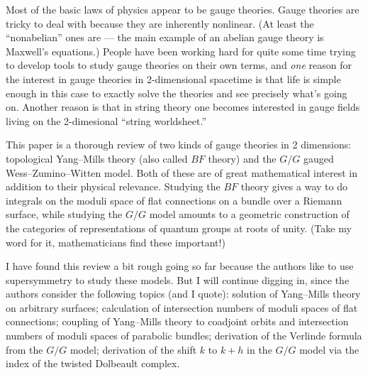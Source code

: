 \documentclass{article}
\def\tightlist{}
\renewcommand{\texttt}[1]{%
  \begingroup
  \ttfamily
  \begingroup\lccode`~=`/\lowercase{\endgroup\def~}{/\discretionary{}{}{}}%
  \begingroup\lccode`~=`[\lowercase{\endgroup\def~}{[\discretionary{}{}{}}%
  \begingroup\lccode`~=`.\lowercase{\endgroup\def~}{.\discretionary{}{}{}}%
  \catcode`/=\active\catcode`[=\active\catcode`.=\active
  \scantokens{#1\noexpand}%
  \endgroup
}
\begin{document}

Most of the basic laws of physics appear to be gauge theories. Gauge
theories are tricky to deal with because they are inherently nonlinear.
(At least the ``nonabelian'' ones are --- the main example of an abelian
gauge theory is Maxwell's equations.) People have been working hard for
quite some time trying to develop tools to study gauge theories on their
own terms, and \emph{one} reason for the interest in gauge theories in
2-dimensional spacetime is that life is simple enough in this case to
exactly solve the theories and see precisely what's going on. Another
reason is that in string theory one becomes interested in gauge fields
living on the 2-dimesional ``string worldsheet.''

This paper is a thorough review of two kinds of gauge theories in 2
dimensions: topological Yang--Mills theory (also called \(BF\) theory)
and the \(G/G\) gauged Wess--Zumino--Witten model. Both of these are of
great mathematical interest in addition to their physical relevance.
Studying the \(BF\) theory gives a way to do integrals on the moduli
space of flat connections on a bundle over a Riemann surface, while
studying the \(G/G\) model amounts to a geometric construction of the
categories of representations of quantum groups at roots of unity. (Take
my word for it, mathematicians find these important!)

I have found this review a bit rough going so far because the authors
like to use supersymmetry to study these models. But I will continue
digging in, since the authors consider the following topics (and I
quote): solution of Yang--Mills theory on arbitrary surfaces; calculation
of intersection numbers of moduli spaces of flat connections; coupling
of Yang--Mills theory to coadjoint orbits and intersection numbers of
moduli spaces of parabolic bundles; derivation of the Verlinde formula
from the \(G/G\) model; derivation of the shift \(k\) to \(k+h\) in the
\(G/G\) model via the index of the twisted Dolbeault complex.

\end{document}

